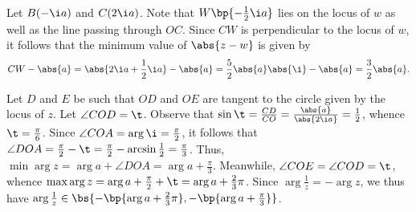 \begin{solution}
    \begin{ppart}
        Let $B(-\i a)$ and $C(2\i a)$. Note that $W\bp{-\frac12 \i a}$ lies on the locus of $w$ as well as the line passing through $OC$. Since $CW$ is perpendicular to the locus of $w$, it follows that the minimum value of $\abs{z - w}$ is given by \[CW - \abs{a} = \abs{2\i a + \frac12 \i a} - \abs{a} = \frac52 \abs{a} \abs{\i} - \abs{a} = \frac32 \abs{a}.\]
    \end{ppart}
    \begin{ppart}
        Let $D$ and $E$ be such that $OD$ and $OE$ are tangent to the circle given by the locus of $z$. Let $\angle COD = \t$. Observe that $\sin \t = \frac{CD}{CO} = \frac{\abs{a}}{\abs{2\i a}} = \frac12$, whence $\t = \frac\pi6$. Since $\angle COA = \arg \i = \frac\pi2$, it follows that $\angle DOA = \frac\pi2 - \t = \frac\pi2 - \arcsin \frac12 = \frac\pi3$. Thus, $\min \arg z = \arg a + \angle DOA = \arg a + \frac\pi3$. Meanwhile, $\angle COE = \angle COD = \t$, whence $\max \arg z = \arg a + \frac\pi2 + \t = \arg a + \frac23 \pi$. Since $\arg \frac1z = -\arg z$, we thus have $\arg \frac1z \in \bs{-\bp{\arg a + \frac23 \pi}, -\bp{\arg a + \frac\pi3}}$.
    \end{ppart}
\end{solution}


